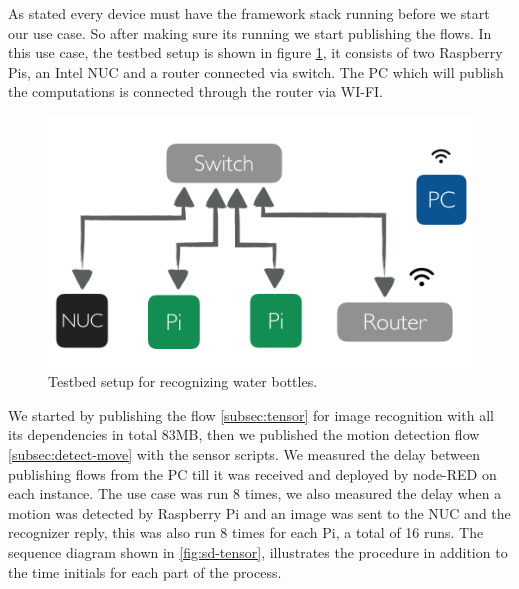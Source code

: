 \noindent As stated every device must have the framework stack running before we start our use case. So after making sure its running we start publishing the flows. In this use case, the testbed setup is shown in figure \ref{fig:tb-tensor}, it consists of two Raspberry Pis, an Intel NUC and a router connected via switch. The PC which will publish the computations is connected through the router via WI-FI. 
 \begin{figure}[H]
	\centering
	\includegraphics[scale=0.6]{images/tb-tensor.png}
	\caption{Testbed setup for recognizing water bottles.}
	\label{fig:tb-tensor}
\end{figure} 



\noindent We started by publishing the flow \ref{subsec:tensor} for  image recognition with all its dependencies in total 83MB, then we published the motion detection flow \ref{subsec:detect-move} with the sensor scripts. We measured the delay between publishing flows from the PC till it was received and deployed by node-RED on each instance. The use case was run 8 times, we also measured the delay when a motion was detected by Raspberry Pi and an image was sent to the NUC and the recognizer reply, this was also run 8 times for each Pi, a total of 16 runs. The sequence diagram shown in \ref{fig:sd-tensor},  illustrates the procedure in addition to the time initials for each part of the process.  \\



